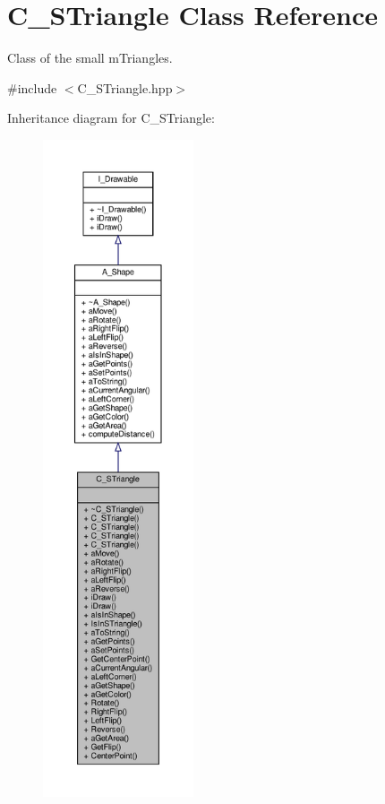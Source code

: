 \hypertarget{classC__STriangle}{}\section{C\+\_\+\+S\+Triangle Class Reference}
\label{classC__STriangle}


Class of the small m\+Triangles.  




{\ttfamily \#include $<$C\+\_\+\+S\+Triangle.\+hpp$>$}



Inheritance diagram for C\+\_\+\+S\+Triangle\+:\nopagebreak
\begin{figure}[H]
\begin{center}
\leavevmode
\includegraphics[height=550pt]{classC__STriangle__inherit__graph}
\end{center}
\end{figure}


